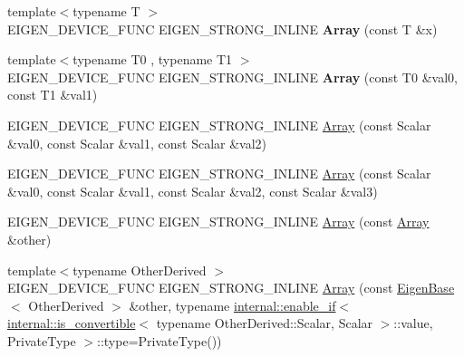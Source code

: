 \begin{DoxyCompactItemize}
\item 
\mbox{\label{class_eigen_1_1_array_a3dd2f09f5133f31d434a98d60a48ede3}} 
{\footnotesize template$<$typename T $>$ }\\E\+I\+G\+E\+N\+\_\+\+D\+E\+V\+I\+C\+E\+\_\+\+F\+U\+NC E\+I\+G\+E\+N\+\_\+\+S\+T\+R\+O\+N\+G\+\_\+\+I\+N\+L\+I\+NE {\bfseries Array} (const T \&x)
\item 
\mbox{\label{class_eigen_1_1_array_ae2c43c4d02176b5dcd1037fde7eaa97e}} 
{\footnotesize template$<$typename T0 , typename T1 $>$ }\\E\+I\+G\+E\+N\+\_\+\+D\+E\+V\+I\+C\+E\+\_\+\+F\+U\+NC E\+I\+G\+E\+N\+\_\+\+S\+T\+R\+O\+N\+G\+\_\+\+I\+N\+L\+I\+NE {\bfseries Array} (const T0 \&val0, const T1 \&val1)
\item 
E\+I\+G\+E\+N\+\_\+\+D\+E\+V\+I\+C\+E\+\_\+\+F\+U\+NC E\+I\+G\+E\+N\+\_\+\+S\+T\+R\+O\+N\+G\+\_\+\+I\+N\+L\+I\+NE \mbox{\hyperlink{class_eigen_1_1_array_adefff5a86babb44c362bd799c1cda965}{Array}} (const Scalar \&val0, const Scalar \&val1, const Scalar \&val2)
\item 
E\+I\+G\+E\+N\+\_\+\+D\+E\+V\+I\+C\+E\+\_\+\+F\+U\+NC E\+I\+G\+E\+N\+\_\+\+S\+T\+R\+O\+N\+G\+\_\+\+I\+N\+L\+I\+NE \mbox{\hyperlink{class_eigen_1_1_array_ad4d80ab64904b4b4e8e59d8a96f659b4}{Array}} (const Scalar \&val0, const Scalar \&val1, const Scalar \&val2, const Scalar \&val3)
\item 
E\+I\+G\+E\+N\+\_\+\+D\+E\+V\+I\+C\+E\+\_\+\+F\+U\+NC E\+I\+G\+E\+N\+\_\+\+S\+T\+R\+O\+N\+G\+\_\+\+I\+N\+L\+I\+NE \mbox{\hyperlink{class_eigen_1_1_array_a085268ca25404d706e7b8f4d33f15513}{Array}} (const \mbox{\hyperlink{class_eigen_1_1_array}{Array}} \&other)
\item 
{\footnotesize template$<$typename Other\+Derived $>$ }\\E\+I\+G\+E\+N\+\_\+\+D\+E\+V\+I\+C\+E\+\_\+\+F\+U\+NC E\+I\+G\+E\+N\+\_\+\+S\+T\+R\+O\+N\+G\+\_\+\+I\+N\+L\+I\+NE \mbox{\hyperlink{class_eigen_1_1_array_a7a08ebcc8bef6c9df21becd525792240}{Array}} (const \mbox{\hyperlink{struct_eigen_1_1_eigen_base}{Eigen\+Base}}$<$ Other\+Derived $>$ \&other, typename \mbox{\hyperlink{struct_eigen_1_1internal_1_1enable__if}{internal\+::enable\+\_\+if}}$<$ \mbox{\hyperlink{struct_eigen_1_1internal_1_1is__convertible}{internal\+::is\+\_\+convertible}}$<$ typename Other\+Derived\+::\+Scalar, Scalar $>$\+::value, Private\+Type $>$\+::type=Private\+Type())
\item 
\mbox{\label{class_eigen_1_1_array_a68f7f43d240ea5d7d50d74c5cc11d8c4}} 

\end{DoxyCompactItemize}
